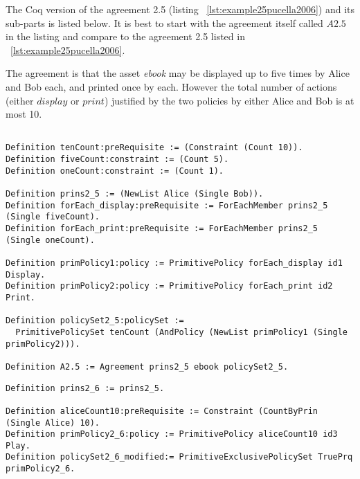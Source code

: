 The Coq version of the agreement 2.5 (listing ~\ref{lst:example25pucella2006}) and its sub-parts is listed below. It is best to start with the agreement itself called $A2.5$ in the listing and compare to the agreement 2.5 listed in ~\ref{lst:example25pucella2006}.

The agreement is that the asset \emph{ebook} may be displayed up to five times by Alice and Bob each, and printed once by each. However the total number of actions (either $display$ or $print$) justified by the two policies by either Alice and Bob is at most 10.


\lstset{language=Coq}
\begin{lstlisting}[frame=single, caption={Example 2.5},label={lst:example25}]

Definition tenCount:preRequisite := (Constraint (Count 10)).
Definition fiveCount:constraint := (Count 5).
Definition oneCount:constraint := (Count 1).

Definition prins2_5 := (NewList Alice (Single Bob)).
Definition forEach_display:preRequisite := ForEachMember prins2_5 (Single fiveCount).
Definition forEach_print:preRequisite := ForEachMember prins2_5 (Single oneCount).

Definition primPolicy1:policy := PrimitivePolicy forEach_display id1 Display.
Definition primPolicy2:policy := PrimitivePolicy forEach_print id2 Print.

Definition policySet2_5:policySet :=
  PrimitivePolicySet tenCount (AndPolicy (NewList primPolicy1 (Single primPolicy2))).
                     
Definition A2.5 := Agreement prins2_5 ebook policySet2_5.

\end{lstlisting}


\lstset{language=Coq}
\begin{lstlisting}[frame=single, caption={Example 2.6},label={lst:example26}]
Definition prins2_6 := prins2_5.

Definition aliceCount10:preRequisite := Constraint (CountByPrin (Single Alice) 10).
Definition primPolicy2_6:policy := PrimitivePolicy aliceCount10 id3 Play.
Definition policySet2_6_modified:= PrimitiveExclusivePolicySet TruePrq primPolicy2_6.
\end{lstlisting}


\lstset{language=Coq}
\begin{lstlisting}[frame=single, caption={Example 2.4},label={lst:example24}]

\end{lstlisting}


\lstset{language=Coq}
\begin{lstlisting}[frame=single, caption={Example 2.5},label={lst:example25}]

\end{lstlisting}


\lstset{language=Coq}
\begin{lstlisting}[frame=single, caption={Example 2.6},label={lst:example26}]

\end{lstlisting}


